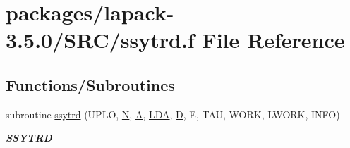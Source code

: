 \hypertarget{ssytrd_8f}{}\section{packages/lapack-\/3.5.0/\+S\+R\+C/ssytrd.f File Reference}
\label{ssytrd_8f}
\subsection*{Functions/\+Subroutines}
\begin{DoxyCompactItemize}
\item 
subroutine \hyperlink{group__realSYcomputational_ga6f435f24bbc42c21a66bc5774509ec86}{ssytrd} (U\+P\+L\+O, \hyperlink{polmisc_8c_a0240ac851181b84ac374872dc5434ee4}{N}, \hyperlink{classA}{A}, \hyperlink{example__user_8c_ae946da542ce0db94dced19b2ecefd1aa}{L\+D\+A}, \hyperlink{odrpack_8h_a7dae6ea403d00f3687f24a874e67d139}{D}, E, T\+A\+U, W\+O\+R\+K, L\+W\+O\+R\+K, I\+N\+F\+O)
\begin{DoxyCompactList}\small\item\em {\bfseries S\+S\+Y\+T\+R\+D} \end{DoxyCompactList}\end{DoxyCompactItemize}
